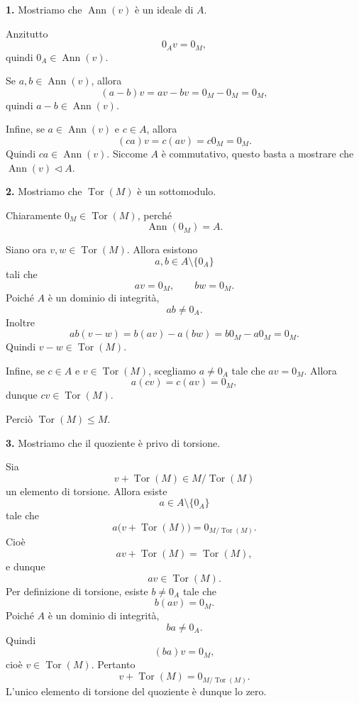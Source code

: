 \documentclass[a4paper]{article}
\begin{document}
\begin{radioactive}
\begin{snippetproof}{}
    \textbf{1.}
    Mostriamo che \(\operatorname{Ann}(v)\) è un ideale di \(A\).

    Anzitutto
    \[
        0_Av=0_M,
    \]
    quindi \(0_A\in \operatorname{Ann}(v)\).

    Se \(a,b\in \operatorname{Ann}(v)\), allora
    \[
        (a-b)v=av-bv=0_M-0_M=0_M,
    \]
    quindi \(a-b\in \operatorname{Ann}(v)\).

    Infine, se \(a\in \operatorname{Ann}(v)\) e \(c\in A\), allora
    \[
        (ca)v=c(av)=c0_M=0_M.
    \]
    Quindi \(ca\in \operatorname{Ann}(v)\). Siccome \(A\) è commutativo, questo basta a mostrare che \(\operatorname{Ann}(v)\triangleleft A\).

    \textbf{2.}
    Mostriamo che \(\operatorname{Tor}(M)\) è un sottomodulo.

    Chiaramente \(0_M\in \operatorname{Tor}(M)\), perché
    \[
        \operatorname{Ann}(0_M)=A.
    \]

    Siano ora \(v,w\in \operatorname{Tor}(M)\). Allora esistono
    \[
        a,b\in A\setminus\{0_A\}
    \]
    tali che
    \[
        av=0_M,
        \qquad
        bw=0_M.
    \]
    Poiché \(A\) è un dominio di integrità,
    \[
        ab\neq 0_A.
    \]
    Inoltre
    \[
        ab(v-w)
        =
        b(av)-a(bw)
        =
        b0_M-a0_M
        =
        0_M.
    \]
    Quindi \(v-w\in \operatorname{Tor}(M)\).

    Infine, se \(c\in A\) e \(v\in \operatorname{Tor}(M)\), scegliamo \(a\neq 0_A\) tale che \(av=0_M\). Allora
    \[
        a(cv)=c(av)=0_M,
    \]
    dunque \(cv\in \operatorname{Tor}(M)\).

    Perciò \(\operatorname{Tor}(M)\leq M\).

    \textbf{3.}
    Mostriamo che il quoziente è privo di torsione.

    Sia
    \[
        v+\operatorname{Tor}(M)\in M/\operatorname{Tor}(M)
    \]
    un elemento di torsione. Allora esiste
    \[
        a\in A\setminus\{0_A\}
    \]
    tale che
    \[
        a\big(v+\operatorname{Tor}(M)\big)
        =
        0_{M/\operatorname{Tor}(M)}.
    \]
    Cioè
    \[
        av+\operatorname{Tor}(M)
        =
        \operatorname{Tor}(M),
    \]
    e dunque
    \[
        av\in \operatorname{Tor}(M).
    \]
    Per definizione di torsione, esiste \(b\neq 0_A\) tale che
    \[
        b(av)=0_M.
    \]
    Poiché \(A\) è un dominio di integrità,
    \[
        ba\neq 0_A.
    \]
    Quindi
    \[
        (ba)v=0_M,
    \]
    cioè \(v\in \operatorname{Tor}(M)\). Pertanto
    \[
        v+\operatorname{Tor}(M)=0_{M/\operatorname{Tor}(M)}.
    \]
    L'unico elemento di torsione del quoziente è dunque lo zero.
\end{snippetproof}
\end{radioactive}
\end{document}
